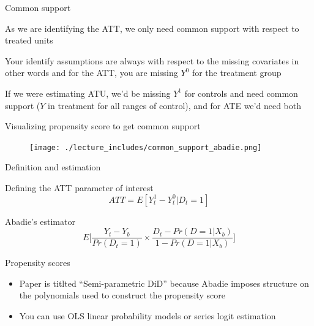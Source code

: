 \documentclass{beamer}
\begin{document}
\begin{frame}{Common support}

As we are identifying the ATT, we only need common support with respect to treated units

\bigskip

Your identify assumptions are always with respect to the missing covariates in other words and for the ATT, you are missing $Y^0$ for the treatment group

\bigskip

If we were estimating ATU, we'd be missing $Y^1$ for controls and need common support ($Y$ in treatment for all ranges of control), and for ATE we'd need both

\end{frame}

\begin{frame}{Visualizing propensity score to get common support}

	\begin{figure}
	\texttt{[image: ./lecture\_includes/common\_support\_abadie.png]}
	\end{figure}

\end{frame}

\begin{frame}{Definition and estimation}

Defining the ATT parameter of interest
\begin{equation}
ATT=E[Y^1_t - Y^0_t |D_t=1]
\end{equation}

\bigskip
Abadie's estimator
\begin{equation}
E\bigg [ \frac{Y_t - Y_b}{Pr(D_t=1)} \times \frac{D_t - Pr(D=1|X_b)}{1-Pr(D=1|X_b)} \bigg ]
\end{equation}


\end{frame}


\begin{frame}{Propensity scores}

\begin{itemize}
\item Paper is titlted ``Semi-parametric DiD'' because Abadie imposes structure on the polynomials used to construct the propensity score
\item You can use OLS linear probability models or series logit estimation
\end{itemize}

\end{frame}
\end{document}
